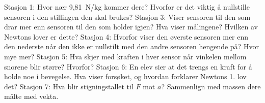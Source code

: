 \documentclass[11pt]{article}
\begin{document}
\begin{oppgaveliste}
\oppgave {}Stasjon 1: Hvor nær 9,81~N/kg kommer dere? Hvorfor er det viktig å nullstille sensoren i den stillingen den skal brukes?
\svar
\oppgave {}Stasjon 3: Viser sensoren til den som drar mer enn sensoren til den som holder igjen? Hva viser målingene? Hvilken av Newtons lover er dette?
\svar
\oppgave {}Stasjon 4: Hvorfor viser den øverste sensoren mer enn den nederste når den ikke er nullstilt med den andre sensoren hengende på? Hvor mye mer?
\svar
\oppgave {}Stasjon 5: Hva skjer med kraften i hver sensor når vinkelen mellom snorene blir større? Hvorfor?
\svar
\oppgave {}Stasjon 6: En elev sier at det trengs en kraft for å holde noe i bevegelse. Hva viser forsøket, og hvordan forklarer Newtons 1. lov det?
\svar
\oppgave {}Stasjon 7: Hva blir stigningstallet til $F$ mot $a$? Sammenlign med massen dere målte med vekta.
\svar
\end{oppgaveliste}
\end{document}
